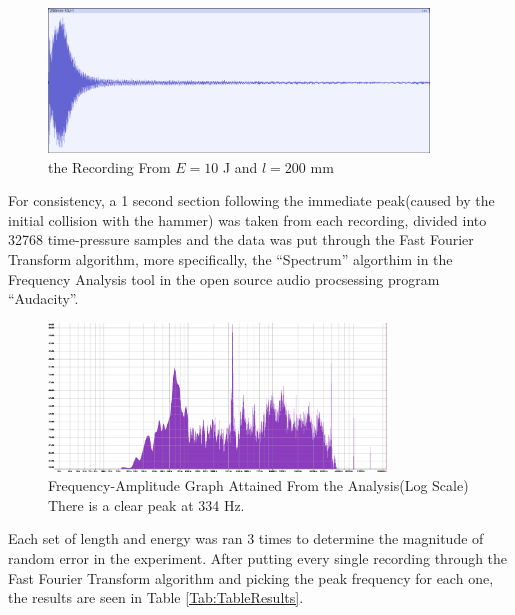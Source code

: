 \documentclass[a4paper,12pt]{article}
\begin{document}
    \begin{figure}[H]%
    \includegraphics[width=0.9\textwidth]{Recording}
    \centering
    \caption{the Recording From $E=10$ J and $l=200$ mm}\label{fig:recPic}
    \end{figure}
    For consistency, a 1 second section following the immediate peak(caused by the initial collision with the hammer) was taken from each recording, divided into 32768 time-pressure samples and the data was put through the Fast Fourier Transform algorithm, more specifically, the ``Spectrum'' algorthim in the Frequency Analysis tool in the open source audio procsessing program ``Audacity''.
    \begin{figure}[H]%
    \includegraphics[width=0.8\textwidth]{FFTImage}
    \centering
    \caption{Frequency-Amplitude Graph Attained From the Analysis(Log Scale) There is a clear peak at 334 Hz.}\label{fig:FFTPic}
    \end{figure}
    Each set of length and energy was ran 3 times to determine the magnitude of random error in the experiment. After putting every single recording through the Fast Fourier Transform algorithm and picking the peak frequency for each one, the results are seen in Table \ref{Tab:TableResults}.
\end{document}
